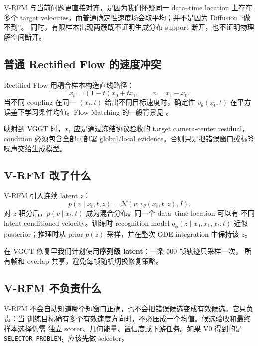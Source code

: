 \documentclass[UTF8,a4paper,11pt]{ctexart}
\begin{document}
V-RFM 与当前问题更直接对齐，是因为我们怀疑同一 data--time location 上存在多个
target velocities，而普通确定性速度场会取平均；并不是因为 Diffusion “做不到”。
同时，有限样本出现两簇既不证明生成分布 support 断开，也不证明物理解空间断开。

\subsection{普通 Rectified Flow 的速度冲突}

Rectified Flow 用耦合样本构造直线路径\citep{liu2023flowstraight}：
\begin{equation}
  x_t=(1-t)x_0+t x_1,
  \qquad v=x_1-x_0.
\end{equation}
当不同 coupling 在同一 $(x_t,t)$ 给出不同目标速度时，确定性
$v_\theta(x_t,t)$ 在平方误差下学习条件均值。Flow Matching 的一般背景见
\citet{lipman2023flow}。

映射到 VGGT 时，$x_1$ 应是通过冻结协议验收的 target camera-center residual，condition
必须包含全部可部署 global/local evidence。否则只是把错误窗口或标签噪声交给生成模型。

\subsection{V-RFM 改了什么}

V-RFM 引入连续 latent $z$\citep{guo2025variational}：
\begin{equation}
  p(v\mid x_t,t,z)=\mathcal N\!\left(v;
  v_\theta(x_t,t,z),I\right).
  \label{eq:vrfm-velocity}
\end{equation}
对 $z$ 积分后，$p(v\mid x_t,t)$ 成为混合分布。同一个 data--time location 可以有
不同 latent-conditioned velocity。训练时 recognition model
$q_\phi(z\mid x_0,x_1,x_t,t)$ 近似 posterior；推理时从 prior $p(z)$ 采样，并在整次
ODE integration 中保持该 $z$。

在 VGGT 修复里我们计划使用\textbf{序列级 latent}：一条 500 帧轨迹只采样一次，
所有帧和 overlap 共享，避免每帧随机切换修复策略。

\subsection{V-RFM 不负责什么}

V-RFM 不会自动知道哪个短窗口正确，也不会把错误候选变成有效候选。它只负责：当
训练目标确有多个有效速度方向时，不必压成一个均值。候选验收和最终样本选择仍需
独立 scorer、几何能量、置信度或下游任务。如果 V0 得到的是
\texttt{SELECTOR\_PROBLEM}，应该先做 selector。
\end{document}
